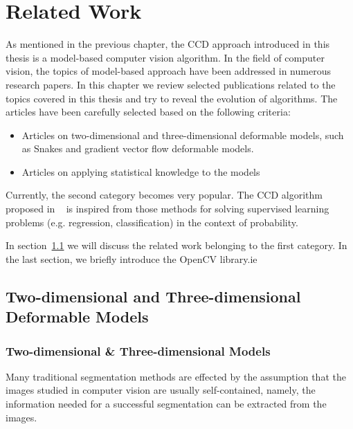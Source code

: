 \chapter{Related Work}
\label{chapter:related}

As mentioned in the previous chapter, the
CCD approach introduced in this thesis is a model-based computer
vision algorithm. In the field of
computer vision, the topics of model-based approach have been addressed in numerous research papers.
In this chapter we review selected publications related to the topics
covered in this thesis and try to reveal the evolution of algorithms. The
articles have been carefully selected based on the following criteria:
\begin{itemize}
\item Articles on two-dimensional and three-dimensional deformable models,
  such as Snakes and gradient vector flow deformable models.
\item Articles on applying statistical knowledge to the models
\end{itemize}
Currently, the second category becomes very popular. The CCD algorithm proposed in
~\cite{hanek2004contracting} is inspired from those methods for solving
supervised learning problems (e.g. regression, classification) in
the context of probability.

In section~\ref{sec:2d3ddm} we will discuss the related work
belonging to the first category. In the last section, we briefly
introduce the OpenCV library.ie 

\section{Two-dimensional and Three-dimensional Deformable Models}
\label{sec:2d3ddm}

\subsection{Two-dimensional \& Three-dimensional Models}
\label{sec:23m}
Many traditional segmentation methods are effected by the assumption that the
images studied in computer vision are usually self-contained, namely,
the information needed for a successful segmentation can be extracted
from the images.


